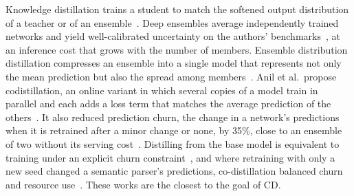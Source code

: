 Knowledge distillation trains a student to match the softened output
distribution of a teacher or of an ensemble~\cite{hinton2015distilling}.
Deep ensembles average independently trained networks and yield
well-calibrated uncertainty on the authors'
benchmarks~\cite{lakshminarayanan2016simple}, at an inference cost
that grows with the number of members.
Ensemble distribution distillation compresses an
ensemble into a single model that represents not only the mean
prediction but also the spread among members~\cite{malinin2019ensemble}.
Anil et al.\ propose codistillation, an online variant in which
several copies of a model train in parallel and each adds a loss term
that matches the average prediction of the
others~\cite{anil2018large}.
It also reduced prediction churn, the change in a network's
predictions when it is retrained after a minor change or none, by 35\%,
close to an ensemble of two without its serving cost~\cite{anil2018large}.
Distilling from the base model is equivalent to training under an
explicit churn constraint~\cite{jiang2022churn}, and where retraining
with only a new seed changed a semantic parser's predictions,
co-distillation balanced churn and resource use~\cite{hidey2022reducing}.
These works are the closest to the goal of CD.

